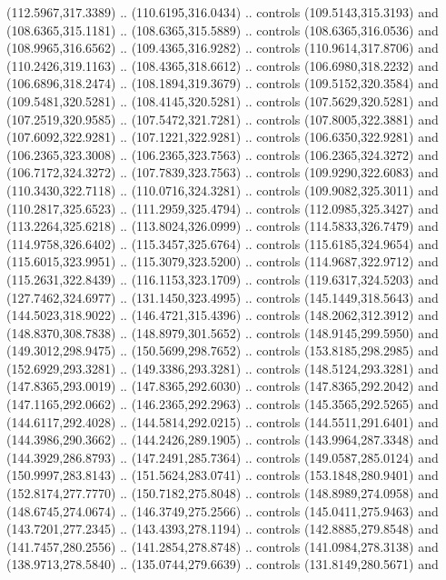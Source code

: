 \begin{scope}[cm={{1.25,0.0,0.0,-1.25,(0.0,743.43331)}}]
    (112.5967,317.3389) .. (110.6195,316.0434) .. controls (109.5143,315.3193) and
    (108.6365,315.1181) .. (108.6365,315.5889) .. controls (108.6365,316.0536) and
    (108.9965,316.6562) .. (109.4365,316.9282) .. controls (110.9614,317.8706) and
    (110.2426,319.1163) .. (108.4365,318.6612) .. controls (106.6980,318.2232) and
    (106.6896,318.2474) .. (108.1894,319.3679) .. controls (109.5152,320.3584) and
    (109.5481,320.5281) .. (108.4145,320.5281) .. controls (107.5629,320.5281) and
    (107.2519,320.9585) .. (107.5472,321.7281) .. controls (107.8005,322.3881) and
    (107.6092,322.9281) .. (107.1221,322.9281) .. controls (106.6350,322.9281) and
    (106.2365,323.3008) .. (106.2365,323.7563) .. controls (106.2365,324.3272) and
    (106.7172,324.3272) .. (107.7839,323.7563) .. controls (109.9290,322.6083) and
    (110.3430,322.7118) .. (110.0716,324.3281) .. controls (109.9082,325.3011) and
    (110.2817,325.6523) .. (111.2959,325.4794) .. controls (112.0985,325.3427) and
    (113.2264,325.6218) .. (113.8024,326.0999) .. controls (114.5833,326.7479) and
    (114.9758,326.6402) .. (115.3457,325.6764) .. controls (115.6185,324.9654) and
    (115.6015,323.9951) .. (115.3079,323.5200) .. controls (114.9687,322.9712) and
    (115.2631,322.8439) .. (116.1153,323.1709) .. controls (119.6317,324.5203) and
    (127.7462,324.6977) .. (131.1450,323.4995) .. controls (145.1449,318.5643) and
    (144.5023,318.9022) .. (146.4721,315.4396) .. controls (148.2062,312.3912) and
    (148.8370,308.7838) .. (148.8979,301.5652) .. controls (148.9145,299.5950) and
    (149.3012,298.9475) .. (150.5699,298.7652) .. controls (153.8185,298.2985) and
    (152.6929,293.3281) .. (149.3386,293.3281) .. controls (148.5124,293.3281) and
    (147.8365,293.0019) .. (147.8365,292.6030) .. controls (147.8365,292.2042) and
    (147.1165,292.0662) .. (146.2365,292.2963) .. controls (145.3565,292.5265) and
    (144.6117,292.4028) .. (144.5814,292.0215) .. controls (144.5511,291.6401) and
    (144.3986,290.3662) .. (144.2426,289.1905) .. controls (143.9964,287.3348) and
    (144.3929,286.8793) .. (147.2491,285.7364) .. controls (149.0587,285.0124) and
    (150.9997,283.8143) .. (151.5624,283.0741) .. controls (153.1848,280.9401) and
    (152.8174,277.7770) .. (150.7182,275.8048) .. controls (148.8989,274.0958) and
    (148.6745,274.0674) .. (146.3749,275.2566) .. controls (145.0411,275.9463) and
    (143.7201,277.2345) .. (143.4393,278.1194) .. controls (142.8885,279.8548) and
    (141.7457,280.2556) .. (141.2854,278.8748) .. controls (141.0984,278.3138) and
    (138.9713,278.5840) .. (135.0744,279.6639) .. controls (131.8149,280.5671) and

\end{scope}
